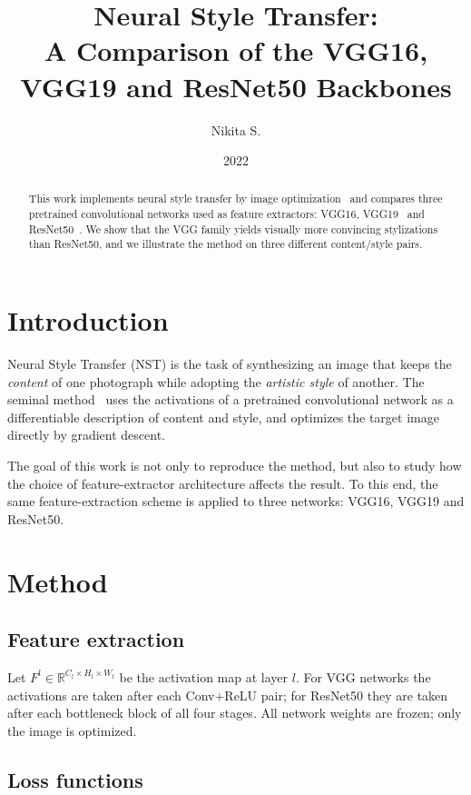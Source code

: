 \documentclass[12pt,a4paper]{article}
\title{Neural Style Transfer: \\ A Comparison of the VGG16, VGG19 and ResNet50 Backbones}
\author{Nikita S.}
\date{2022}
\begin{document}
\maketitle

\begin{abstract}
This work implements neural style transfer by image optimization~\cite{gatys2016}
and compares three pretrained convolutional networks used as feature extractors:
VGG16, VGG19~\cite{simonyan2015} and ResNet50~\cite{he2016}. We show that the
VGG family yields visually more convincing stylizations than ResNet50, and we
illustrate the method on three different content/style pairs.
\end{abstract}

\tableofcontents
\newpage

\section{Introduction}
Neural Style Transfer (NST) is the task of synthesizing an image that keeps the
\emph{content} of one photograph while adopting the \emph{artistic style} of
another. The seminal method~\cite{gatys2015, gatys2016} uses the activations of
a pretrained convolutional network as a differentiable description of content
and style, and optimizes the target image directly by gradient descent.

The goal of this work is not only to reproduce the method, but also to study how
the choice of feature-extractor architecture affects the result. To this end,
the same feature-extraction scheme is applied to three networks: VGG16, VGG19
and ResNet50.

\section{Method}

\subsection{Feature extraction}
Let $F^{l}\in\mathbb{R}^{C_l\times H_l\times W_l}$ be the activation map at layer
$l$. For VGG networks the activations are taken after each Conv${+}$ReLU pair;
for ResNet50 they are taken after each bottleneck block of all four stages. All
network weights are frozen; only the image is optimized.

\subsection{Loss functions}
\end{document}
